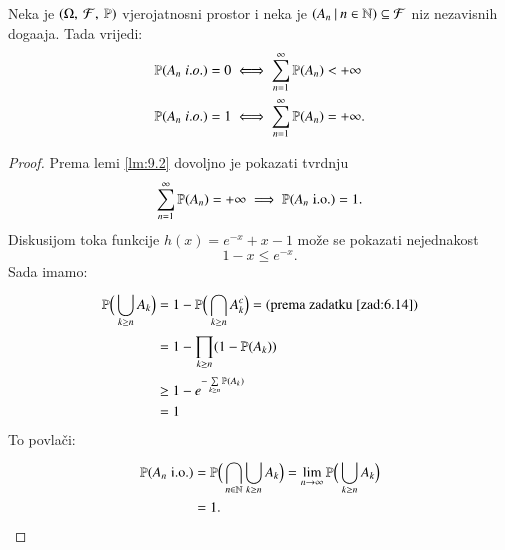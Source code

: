 \begin{tm}   \label{tm:9.3}
    Neka je $(\Omega, \: \mathcal{F}, \: \mathbb{P})$ vjerojatnosni prostor i neka je $({A_n} \: | \: {n \in \mathbb{N}}) \subseteq \mathcal{F}$ niz nezavisnih doga\dj aja.
    Tada vrijedi:
    \begin{equation*}
        \begin{aligned}
            \mathbb{P}({A_n \; i.o.}) = 0 &\iff \sum\limits_{n = 1}^{\infty} \mathbb{P}({A_n}) < +\infty\\
            \mathbb{P}({A_n \; i.o.}) = 1 &\iff \sum\limits_{n = 1}^{\infty} \mathbb{P}({A_n}) = +\infty.
        \end{aligned}
    \end{equation*}
\end{tm}

\begin{proof}
    Prema lemi \ref{lm:9.2} dovoljno je pokazati tvrdnju
    \begin{equation*}
        \sum\limits_{n = 1}^{\infty} \mathbb{P}({A_n}) = + \infty \implies \mathbb{P}({A_n \; \mathrm{i.o.}}) = 1.
    \end{equation*}
    Diskusijom toka funkcije $h(x) = e^{-x} + x - 1$ mo\v ze se pokazati nejednakost
    \begin{equation*}
        1 - x \leq e^{-x}.
    \end{equation*}
    Sada imamo:
    \begin{equation*}
        \begin{aligned}
            \mathbb{P} \Big(\bigcup\limits_{k \geq n}^{} A_k \Big) &= 1 - \mathbb{P} \Big( \bigcap\limits_{k \geq n}^{} A_k^c \Big) = (\textnormal{prema zadatku \ref{zad:6.14}})\\
            &= 1 - \prod\limits_{k \geq n}^{} (1 - \mathbb{P}({A_k}))\\
            &\geq 1 - e^{- \sum\limits_{k \geq n}^{} \mathbb{P}({A_k})}\\
            &= 1
        \end{aligned}
    \end{equation*}
    To povla\v ci:
    \begin{equation*}
        \begin{aligned}
            \mathbb{P} ( A_n \; \mathrm{i.o.} ) &= \mathbb{P} \Big( \bigcap\limits_{n \in \mathbb{N}}^{} \bigcup\limits_{k \geq n}^{} A_k \Big) = \lim\limits_{n \to \infty} \mathbb{P} \Big( \bigcup\limits_{k \geq n}^{} A_k \Big)\\
            &= 1.
        \end{aligned}
    \end{equation*}
\end{proof}


